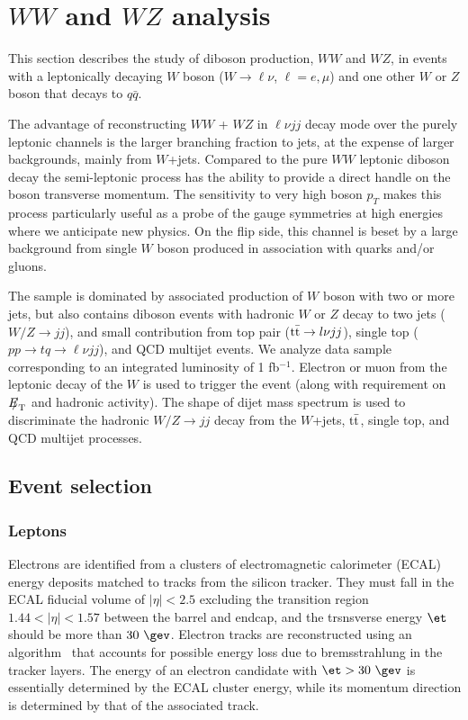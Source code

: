\section{$WW$ and $WZ$ analysis}
This section describes the study of diboson production, $WW$ and $WZ$, in events with a leptonically 
decaying $W$ boson  ($W\to\ell\nu$, $\ell=e,\mu$) and one other 
$W$ or $Z$ boson that decays to $q\bar{q}$.

\par
The advantage of reconstructing $WW$ + $WZ$ in $\ell\nu jj$ decay mode over 
the purely leptonic channels is the larger branching fraction to jets, 
at the expense of larger backgrounds, mainly from $W$+jets.
Compared to the pure $WW$ leptonic diboson decay the semi-leptonic 
process has the ability to  provide a direct handle on the boson transverse 
momentum. 
The sensitivity to very high boson $p_T$ makes this process particularly 
useful as a probe of the gauge symmetries at high energies 
where we anticipate new physics.
On the flip side, this channel is beset by a large background from 
single $W$ boson produced in association with quarks and/or gluons.

\par
The sample is dominated by associated production of $W$ boson 
with two or more jets, but also contains diboson events with hadronic 
$W$ or $Z$ decay to two jets ($W/Z\to jj$), 
and small contribution from 
top pair ($\mathrm{t}\bar{\mathrm{t}}\to l\nu jj$), single top ($pp\to tq \to \ell\nu jj$),
and QCD multijet events. 
We analyze data sample corresponding to an integrated 
luminosity of 1 fb${}^{-1}$.
Electron or muon from the leptonic decay of the $W$ is used to trigger 
the event (along with requirement on ${E\!\!\!/}_{\mathrm{T}}$ and hadronic activity).
The shape of dijet mass spectrum is used to discriminate the hadronic 
$W/Z\to jj$  decay from the $W$+jets, $\mathrm{t}\bar{\mathrm{t}}$, single top, and QCD multijet 
processes.


\subsection{Event selection\label{sec:evtSel}}
\subsubsection{Leptons \label{sec:leptonId}}
\par
Electrons are identified from a clusters of electromagnetic 
calorimeter (ECAL) energy deposits
matched to tracks from the silicon tracker. 
They must fall in the ECAL fiducial volume of $|\eta| < 2.5$ 
excluding the transition region $1.44 < |\eta| < 1.57$ 
between the barrel and endcap, and the trsnsverse energy $\et$ 
should be more than $30~\gev$.
Electron tracks are reconstructed using an
algorithm~\cite{GSF} that accounts for possible energy loss due to
bremsstrahlung in the tracker layers.
The energy of an electron candidate with $\et>30~\gev$ is essentially
determined by the ECAL cluster energy, while its momentum direction
is determined by that of the associated track.

